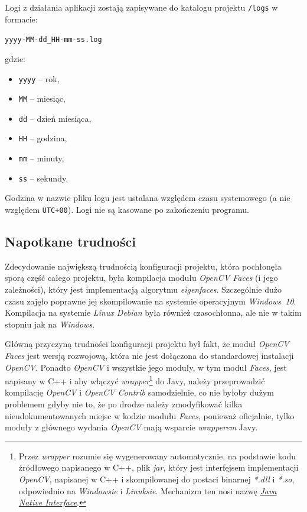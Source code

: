 \documentclass[a4paper,titlepage]{article}
\theoremstyle{break}
\numberwithin{equation}{subsection}
\begin{document}
Logi z działania aplikacji zostają zapisywane do katalogu projektu \texttt{/logs} w formacie:
\begin{center}
\texttt{yyyy-MM-dd\_HH-mm-ss.log}
\end{center}
gdzie:
\begin{itemize}
	\item \texttt{yyyy} -- rok,
	\item \texttt{MM} -- miesiąc,
	\item \texttt{dd} -- dzień miesiąca,
	\item \texttt{HH} -- godzina,
	\item \texttt{mm} -- minuty,
	\item \texttt{ss} -- sekundy.
\end{itemize}
Godzina w nazwie pliku logu jest ustalana względem czasu systemowego (a nie względem \texttt{UTC+00}). Logi nie są kasowane po zakończeniu programu.


\subsection{Napotkane trudności}
\label{sec:trudnosci}

Zdecydowanie największą trudnością konfiguracji projektu, która pochłonęła sporą część całego projektu, była kompilacja modułu \emph{OpenCV Faces} (i jego zależności), który jest implementacją algorytmu \emph{eigenfaces}. Szczególnie dużo czasu zajęło poprawne jej skompilowanie na systemie operacyjnym \emph{Windows~10}. Kompilacja na systemie \emph{Linux Debian} była również czasochłonna, ale nie w takim stopniu jak na \emph{Windows}.

Główną przyczyną trudności konfiguracji projektu był fakt, że moduł \emph{OpenCV Faces} jest wersją rozwojową, która nie jest dołączona do standardowej instalacji \emph{OpenCV}. Ponadto \emph{OpenCV} i wszystkie jego moduły, w tym moduł \emph{Faces}, jest napisany w C++ i aby włączyć \emph{wrapper}\footnote{Przez \emph{wrapper} rozumie się wygenerowany automatycznie, na podstawie kodu źródłowego napisanego w C++, plik \emph{jar}, który jest interfejsem implementacji \emph{OpenCV}, napisanej w C++ i skompilowanej do postaci binarnej \emph{*.dll} i \emph{*.so}, odpowiednio na \emph{Windowsie} i \emph{Linuksie}. Mechanizm ten nosi nazwę \href{https://en.wikipedia.org/wiki/Java_Native_Interface}{\emph{Java Native Interface}}.} do Javy, należy przeprowadzić kompilację \emph{OpenCV} i \emph{OpenCV Contrib} samodzielnie, co nie byłoby dużym problemem gdyby nie to, że po drodze należy zmodyfikować kilka nieudokumentowanych miejsc w kodzie modułu \emph{Faces}, ponieważ oficjalnie, tylko moduły z głównego wydania \emph{OpenCV} mają wsparcie \emph{wrapperem} Javy.
\end{document}
